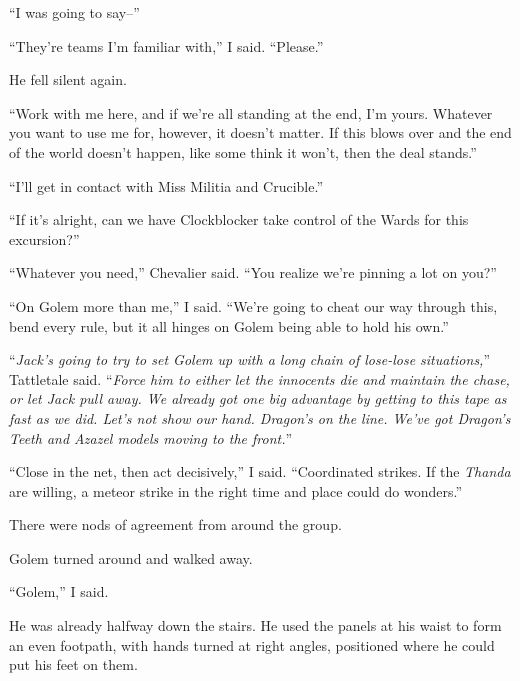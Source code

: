 ``I was going to say--''



``They're teams I'm familiar with,'' I said.  ``Please.''



He fell silent again.



``Work with me here, and if we're all standing at the end, I'm yours.  Whatever you want to use me for, however, it doesn't matter.  If this blows over and the end of the world doesn't happen, like some think it won't, then the deal stands.''



``I'll get in contact with Miss Militia and Crucible.''



``If it's alright, can we have Clockblocker take control of the Wards for this excursion?''



``Whatever you need,'' Chevalier said.  ``You realize we're pinning a lot on you?''



``On Golem more than me,'' I said.  ``We're going to cheat our way through this, bend every rule, but it all hinges on Golem being able to hold his own.''



``\emph{Jack's going to try to set Golem up with a long chain of lose-lose situations,}'' Tattletale said.  ``\emph{Force him to either let the innocents die and maintain the chase, or let Jack pull away.  We already got one big advantage by getting to this tape as fast as we did.  Let's not show our hand.  Dragon's on the line.  We've got Dragon's Teeth and Azazel models moving to the front.}''



``Close in the net, then act decisively,'' I said.  ``Coordinated strikes.  If the \emph{Thanda} are willing, a meteor strike in the right time and place could do wonders.''



There were nods of agreement from around the group.



Golem turned around and walked away.



``Golem,'' I said.



He was already halfway down the stairs.  He used the panels at his waist to form an even footpath, with hands turned at right angles, positioned where he could put his feet on them.



